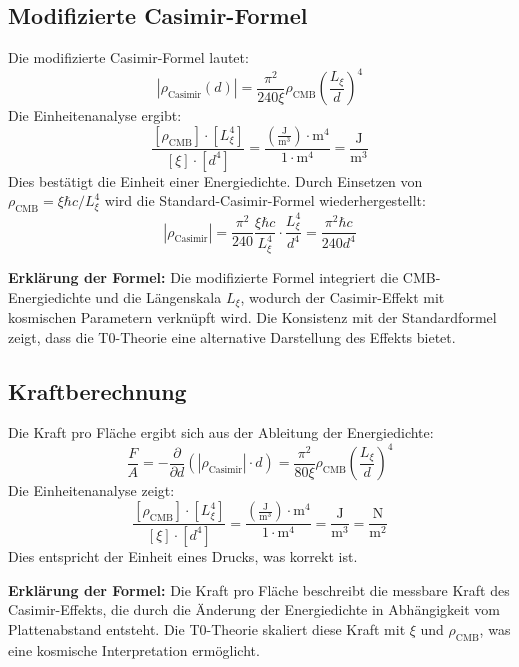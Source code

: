 \documentclass[12pt,a4paper]{article}
\begin{document}
\subsection{Modifizierte Casimir-Formel}
Die modifizierte Casimir-Formel lautet:
\begin{equation}
	|\rho_{\text{Casimir}}(d)| = \frac{\pi^2}{240 \xi} \rho_{\text{CMB}} \left( \frac{L_\xi}{d} \right)^4
\end{equation}
Die Einheitenanalyse ergibt:
\begin{equation}
	\frac{[\rho_{\text{CMB}}] \cdot [L_\xi^4]}{[\xi] \cdot [d^4]} = \frac{\left( \frac{\text{J}}{\text{m}^3} \right) \cdot \text{m}^4}{1 \cdot \text{m}^4} = \frac{\text{J}}{\text{m}^3}
\end{equation}
Dies bestätigt die Einheit einer Energiedichte. Durch Einsetzen von $\rho_{\text{CMB}} = \xi \hbar c / L_\xi^4$ wird die Standard-Casimir-Formel wiederhergestellt:
\begin{equation}
	|\rho_{\text{Casimir}}| = \frac{\pi^2}{240} \frac{\xi \hbar c}{L_\xi^4} \cdot \frac{L_\xi^4}{d^4} = \frac{\pi^2 \hbar c}{240 d^4}
\end{equation}

\textbf{Erklärung der Formel:} Die modifizierte Formel integriert die CMB-Energiedichte und die Längenskala $L_\xi$, wodurch der Casimir-Effekt mit kosmischen Parametern verknüpft wird. Die Konsistenz mit der Standardformel zeigt, dass die T0-Theorie eine alternative Darstellung des Effekts bietet.

\subsection{Kraftberechnung}
Die Kraft pro Fläche ergibt sich aus der Ableitung der Energiedichte:
\begin{equation}
	\frac{F}{A} = -\frac{\partial}{\partial d} \left( |\rho_{\text{Casimir}}| \cdot d \right) = \frac{\pi^2}{80 \xi} \rho_{\text{CMB}} \left( \frac{L_\xi}{d} \right)^4
\end{equation}
Die Einheitenanalyse zeigt:
\begin{equation}
	\frac{[\rho_{\text{CMB}}] \cdot [L_\xi^4]}{[\xi] \cdot [d^4]} = \frac{\left( \frac{\text{J}}{\text{m}^3} \right) \cdot \text{m}^4}{1 \cdot \text{m}^4} = \frac{\text{J}}{\text{m}^3} = \frac{\text{N}}{\text{m}^2}
\end{equation}
Dies entspricht der Einheit eines Drucks, was korrekt ist.

\textbf{Erklärung der Formel:} Die Kraft pro Fläche beschreibt die messbare Kraft des Casimir-Effekts, die durch die Änderung der Energiedichte in Abhängigkeit vom Plattenabstand entsteht. Die T0-Theorie skaliert diese Kraft mit $\xi$ und $\rho_{\text{CMB}}$, was eine kosmische Interpretation ermöglicht.
\end{document}
